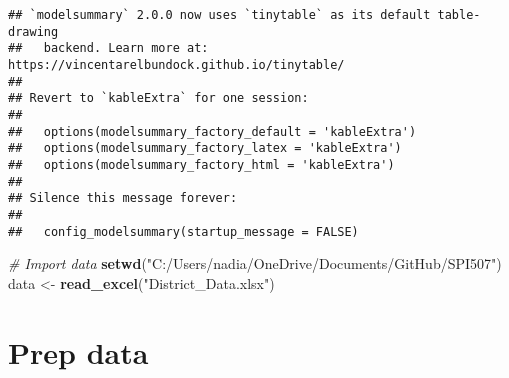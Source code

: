 \documentclass[
]{article}
\newenvironment{Shaded}{\begin{snugshade}}{\end{snugshade}}
\newcommand{\CommentTok}[1]{\textcolor[rgb]{0.56,0.35,0.01}{\textit{#1}}}
\newcommand{\FunctionTok}[1]{\textcolor[rgb]{0.13,0.29,0.53}{\textbf{#1}}}
\newcommand{\NormalTok}[1]{#1}
\newcommand{\OtherTok}[1]{\textcolor[rgb]{0.56,0.35,0.01}{#1}}
\newcommand{\StringTok}[1]{\textcolor[rgb]{0.31,0.60,0.02}{#1}}
\begin{document}
\begin{verbatim}
## `modelsummary` 2.0.0 now uses `tinytable` as its default table-drawing
##   backend. Learn more at: https://vincentarelbundock.github.io/tinytable/
## 
## Revert to `kableExtra` for one session:
## 
##   options(modelsummary_factory_default = 'kableExtra')
##   options(modelsummary_factory_latex = 'kableExtra')
##   options(modelsummary_factory_html = 'kableExtra')
## 
## Silence this message forever:
## 
##   config_modelsummary(startup_message = FALSE)
\end{verbatim}

\begin{Shaded}
\begin{Highlighting}[]
\CommentTok{\# Import data}
\FunctionTok{setwd}\NormalTok{(}\StringTok{"C:/Users/nadia/OneDrive/Documents/GitHub/SPI507"}\NormalTok{)}
\NormalTok{data }\OtherTok{\textless{}{-}} \FunctionTok{read\_excel}\NormalTok{(}\StringTok{"District\_Data.xlsx"}\NormalTok{)}
\end{Highlighting}
\end{Shaded}

\section{Prep data}\label{prep-data}
\end{document}
